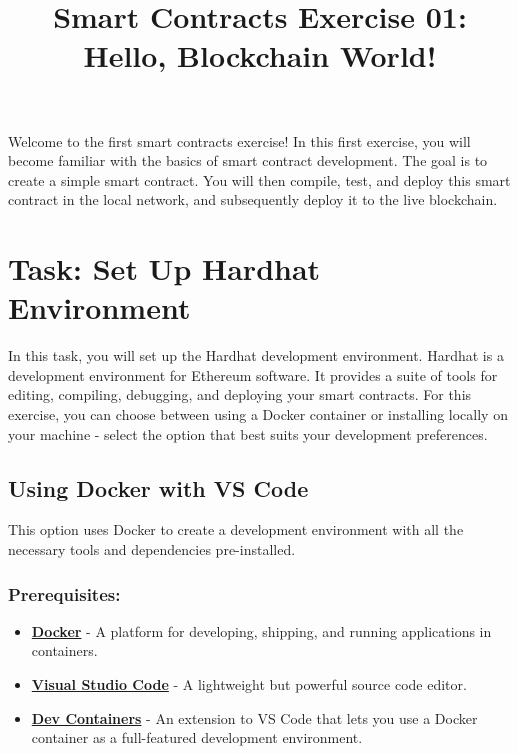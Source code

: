 \documentclass[12pt]{article}
\title{Smart Contracts Exercise 01: \\ Hello, Blockchain World!}
\author{}
\date{}
\begin{document}
\maketitle
\noindent
Welcome to the first smart contracts exercise! In this first exercise, you will become familiar with the basics of smart contract development. The goal is to create a simple smart contract. You will then compile, test, and deploy this smart contract in the local network, and subsequently deploy it to the live blockchain.

\section{Task: Set Up Hardhat Environment}

In this task, you will set up the Hardhat development environment. Hardhat is a
development environment for Ethereum software. It provides a suite of tools for
editing, compiling, debugging, and deploying your smart contracts. For this
exercise, you can choose between using a Docker container or installing locally
on your machine - select the option that best suits your development
preferences.

\subsection{Using Docker with VS Code}

This option uses Docker to create a development environment with all the
necessary tools and dependencies pre-installed.

\subsubsection*{Prerequisites:}

\begin{itemize}
    \item \textbf{\href{https://www.docker.com/products/docker-desktop}{Docker}} - A platform for developing, shipping, and running applications in containers.
    \item \textbf{\href{https://code.visualstudio.com/}{Visual Studio Code}} - A lightweight but powerful source code editor.
    \item \textbf{\href{https://marketplace.visualstudio.com/items?itemName=ms-vscode-remote.remote-containers}{Dev Containers}} - An extension to VS Code that lets you use a Docker container as a full-featured development environment.
\end{itemize}
\end{document}
